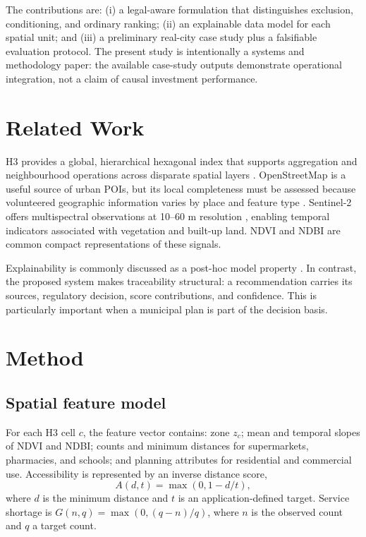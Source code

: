 \documentclass[conference]{IEEEtran}
\begin{document}
The contributions are: (i) a legal-aware formulation that distinguishes exclusion, conditioning, and ordinary ranking; (ii) an explainable data model for each spatial unit; and (iii) a preliminary real-city case study plus a falsifiable evaluation protocol. The present study is intentionally a systems and methodology paper: the available case-study outputs demonstrate operational integration, not a claim of causal investment performance.

\section{Related Work}
H3 provides a global, hierarchical hexagonal index that supports aggregation and neighbourhood operations across disparate spatial layers \cite{h3}. OpenStreetMap is a useful source of urban POIs, but its local completeness must be assessed because volunteered geographic information varies by place and feature type \cite{haklay2010osm}. Sentinel-2 offers multispectral observations at 10--60 m resolution \cite{esaS2}, enabling temporal indicators associated with vegetation and built-up land. NDVI \cite{rouse1974monitoring} and NDBI \cite{zha2003ndbi} are common compact representations of these signals.

Explainability is commonly discussed as a post-hoc model property \cite{lundberg2017shap}. In contrast, the proposed system makes traceability structural: a recommendation carries its sources, regulatory decision, score contributions, and confidence. This is particularly important when a municipal plan is part of the decision basis.

\section{Method}
\subsection{Spatial feature model}
For each H3 cell $c$, the feature vector contains: zone $z_c$; mean and temporal slopes of NDVI and NDBI; counts and minimum distances for supermarkets, pharmacies, and schools; and planning attributes for residential and commercial use. Accessibility is represented by an inverse distance score,
\begin{equation}
A(d,t)=\max(0,1-d/t),
\end{equation}
where $d$ is the minimum distance and $t$ is an application-defined target. Service shortage is $G(n,q)=\max(0,(q-n)/q)$, where $n$ is the observed count and $q$ a target count.
\end{document}

